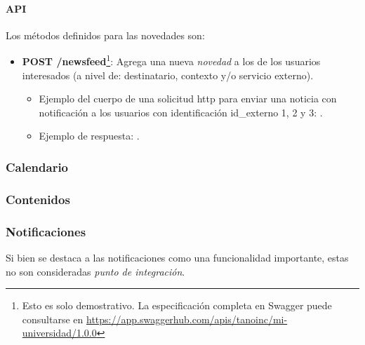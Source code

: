 \paragraph{API}
\label{funcionalidad_noticias_api}

Los métodos definidos para las novedades son:

\begin{itemize}
\item \textbf{POST /newsfeed}\footnote{Esto es solo demostrativo. La especificación completa en Swagger puede consultarse en \url{https://app.swaggerhub.com/apis/tanoinc/mi-universidad/1.0.0}}: Agrega una nueva \textit{novedad} a los  de los usuarios interesados (a nivel de: destinatario, contexto y/o servicio externo).
\begin{itemize}
\item Ejemplo del cuerpo de una solicitud \gls{http} para enviar una noticia con notificación a los usuarios con identificación id\_externo 1, 2 y 3:
\begingroup
  .\label{codigo_post_newsfeed_solicitud}
\endgroup

\item Ejemplo de respuesta:
\begingroup
  .\label{codigo_post_newsfeed_respuesta}
\endgroup
\end{itemize}
\end{itemize}



\subsubsection{Calendario}
\label{funcionalidad_calendario}


\subsubsection{Contenidos}
\label{funcionalidad_contenidos}


\subsubsection{Notificaciones}
\label{funcionalidad_notificaciones}

Si bien se destaca a las notificaciones como una funcionalidad importante, estas no son consideradas \textit{punto de integración}.

